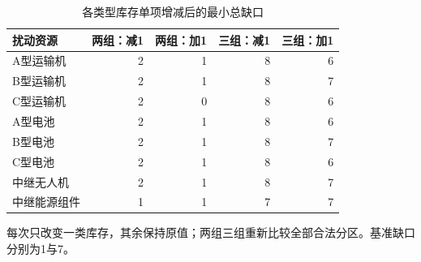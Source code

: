\begin{table}[htbp]\centering\small
\caption{各类型库存单项增减后的最小总缺口}\label{tab:q4_inventory_stress}
\begin{tabular}{@{}lrrrr@{}}
\toprule
扰动资源 & 两组：减1 & 两组：加1 & 三组：减1 & 三组：加1\\
\midrule
A型运输机 & 2 & 1 & 8 & 6\\
B型运输机 & 2 & 1 & 8 & 7\\
C型运输机 & 2 & 0 & 8 & 6\\
A型电池 & 2 & 1 & 8 & 6\\
B型电池 & 2 & 1 & 8 & 7\\
C型电池 & 2 & 1 & 8 & 6\\
中继无人机 & 2 & 1 & 8 & 7\\
中继能源组件 & 1 & 1 & 7 & 7\\
\bottomrule
\end{tabular}
\par\smallskip\parbox{.96\linewidth}{\footnotesize 每次只改变一类库存，其余保持原值；两组三组重新比较全部合法分区。基准缺口分别为1与7。}
\end{table}

